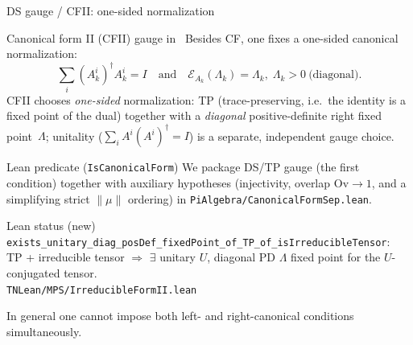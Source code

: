 \documentclass[aspectratio=169,10pt]{beamer}
\newcommand{\cE}{\mathcal{E}}
\newcommand{\Ov}{\mathrm{Ov}}
\begin{document}
\begin{frame}{DS gauge / CFII: one-sided normalization}
    \vspace{-0.6em}

    \begin{block}{Canonical form II (CFII) gauge in~\cite{Cirac2017Annals}}
        Besides CF, one fixes a one-sided canonical normalization:
        \[
            \sum_i (A_k^i)^\dagger A_k^i = I
            \quad\text{and}\quad
            \cE_{A_k}(\Lambda_k)=\Lambda_k,\;\Lambda_k>0\ \text{(diagonal)}.
        \]
        CFII chooses \emph{one-sided} normalization: TP (trace-preserving, i.e.\ the identity is a fixed point of the dual) together with a \emph{diagonal} positive-definite right fixed point~$\Lambda$; unitality ($\sum_i A^i(A^i)^\dagger = I$) is a separate, independent gauge choice.
    \end{block}

    \begin{block}{Lean predicate (\texttt{IsCanonicalForm})}
        We package DS/TP gauge (the first condition) together with auxiliary hypotheses
        (injectivity, overlap $\Ov\to 1$, and a simplifying strict $\|\mu\|$ ordering) in
        \texttt{PiAlgebra/CanonicalFormSep.lean}.
    \end{block}

    \begin{block}{Lean status \textnormal{\scriptsize(new)}}
        {\scriptsize
        \textcolor{leangreen}{\checkmark}~%
        \texttt{exists\_unitary\_diag\_posDef\_fixedPoint\_of\_TP\_of\_isIrreducibleTensor}:\\
        \quad TP + irreducible tensor $\Rightarrow$ $\exists$ unitary $U$, diagonal PD $\Lambda$
        fixed point for the $U$-conjugated tensor.\\
        {\textcolor{dimwhite}{\texttt{TNLean/MPS/IrreducibleFormII.lean}}}~\cite{Cirac2017Annals,Cirac2017Irreducible}}
    \end{block}

    \textcolor{dimwhite}{\footnotesize In general one cannot impose both left- and right-canonical conditions simultaneously.}
\end{frame}

\end{document}
